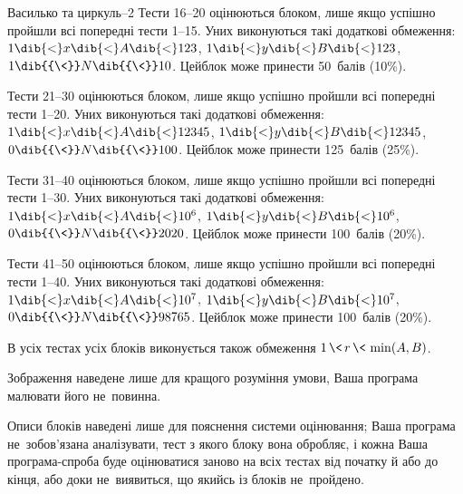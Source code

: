 {\begin{problemAllDefault}{Василько та циркуль--2}
Тести 16--20 оцінюються блоком, лише якщо успішно пройшли всі попередні тести \mbox{1--15}. 
У\nolinebreak[3] них виконуються такі додаткові обмеження: 
$1\dib{{<}}x\dib{{<}}A\dib{{<}}123$,\hspace{0.5em plus 0.5em}
$1\dib{{<}}y\dib{{<}}B\dib{{<}}123$,\hspace{0.5em plus 0.5em}
$1\dib{{\<}}N\dib{{\<}}10$.\linebreak[2]\hspace{0.5em plus 0.5em}
Цей\nolinebreak[3] блок може принести 50~балів (10\%).

Тести 21--30 оцінюються блоком, лише якщо успішно пройшли всі попередні тести \mbox{1--20}. 
У\nolinebreak[3] них виконуються такі додаткові обмеження: 
$1\dib{{<}}x\dib{{<}}A\dib{{<}}12345$,\hspace{0.5em plus 0.5em}
$1\dib{{<}}y\dib{{<}}B\dib{{<}}12345$,\hspace{0.5em plus 0.5em}
$0\dib{{\<}}N\dib{{\<}}100$.\linebreak[2]\hspace{0.5em plus 0.5em}
Цей\nolinebreak[3] блок може принести 125~балів (25\%).

Тести 31--40 оцінюються блоком, лише якщо успішно пройшли всі попередні тести \mbox{1--30}. 
У\nolinebreak[3] них виконуються такі додаткові обмеження: 
$1\dib{{<}}x\dib{{<}}A\dib{{<}}10^6$,\hspace{0.5em plus 0.5em}
$1\dib{{<}}y\dib{{<}}B\dib{{<}}10^6$,\hspace{0.5em plus 0.5em}
$0\dib{{\<}}N\dib{{\<}}2020$.\linebreak[2]\hspace{0.5em plus 0.5em}
Цей\nolinebreak[3] блок може принести 100~балів (20\%).

Тести 41--50 оцінюються блоком, лише якщо успішно пройшли всі попередні тести \mbox{1--40}.
У\nolinebreak[3] них виконуються такі додаткові обмеження: 
$1\dib{{<}}x\dib{{<}}A\dib{{<}}10^7$,\hspace{0.5em plus 0.5em}
$1\dib{{<}}y\dib{{<}}B\dib{{<}}10^7$,\hspace{0.5em plus 0.5em}
$0\dib{{\<}}N\dib{{\<}}98765$.\linebreak[2]\hspace{0.5em plus 0.5em}
Цей\nolinebreak[3] блок може принести 100~балів (20\%).

В усіх тестах усіх блоків виконується також обмеження 
${1\,{\<}\,r\,{\<}\,\min(A,B)}$. 

\Notes
Зображення наведене лише для кращого розуміння умови, \mbox{Ваша} програма малювати його не~повинна.

Описи блоків наведені лише для пояснення системи оцінювання; \mbox{Ваша} програма не~зобов'язана аналізувати, тест з якого блоку вона обробляє, і кожна \mbox{Ваша} програма-спроба буде оцінюватися заново на всіх тестах від початку й або до кінця, або доки не~виявиться, що якийсь із блоків не~пройдено.

\end{problemAllDefault}

}